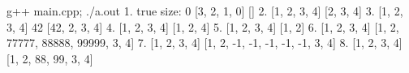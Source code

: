 \begin{console} g++ main.cpp; ./a.out
1.
true
size: 0
[3, 2, 1, 0]
[]
2.
[1, 2, 3, 4]
[2, 3, 4]
3.
[1, 2, 3, 4]
42
[42, 2, 3, 4]
4.
[1, 2, 3, 4]
[1, 2, 4]
5.
[1, 2, 3, 4]
[1, 2]
6.
[1, 2, 3, 4]
[1, 2, 77777, 88888, 99999, 3, 4]
7.
[1, 2, 3, 4]
[1, 2, -1, -1, -1, -1, -1, 3, 4]
8.
[1, 2, 3, 4]
[1, 2, 88, 99, 3, 4]
\end{console}

